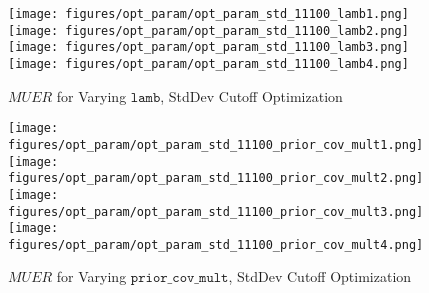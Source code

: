 	\begin{figure}[H]
	\texttt{[image: figures/opt\_param/opt\_param\_std\_11100\_lamb1.png]}%
	\texttt{[image: figures/opt\_param/opt\_param\_std\_11100\_lamb2.png]}%
	\texttt{[image: figures/opt\_param/opt\_param\_std\_11100\_lamb3.png]}%
	\texttt{[image: figures/opt\_param/opt\_param\_std\_11100\_lamb4.png]}%
	\caption{$MUER$ for Varying $\mathtt{lamb}$, StdDev Cutoff Optimization}
	\end{figure}

	\begin{figure}[H]
	\texttt{[image: figures/opt\_param/opt\_param\_std\_11100\_prior\_cov\_mult1.png]}%
	\texttt{[image: figures/opt\_param/opt\_param\_std\_11100\_prior\_cov\_mult2.png]}%
	\texttt{[image: figures/opt\_param/opt\_param\_std\_11100\_prior\_cov\_mult3.png]}%
	\texttt{[image: figures/opt\_param/opt\_param\_std\_11100\_prior\_cov\_mult4.png]}%
	\caption{$MUER$ for Varying $\mathtt{prior\_cov\_mult}$, StdDev Cutoff Optimization}
	\end{figure}
	\fi


​

